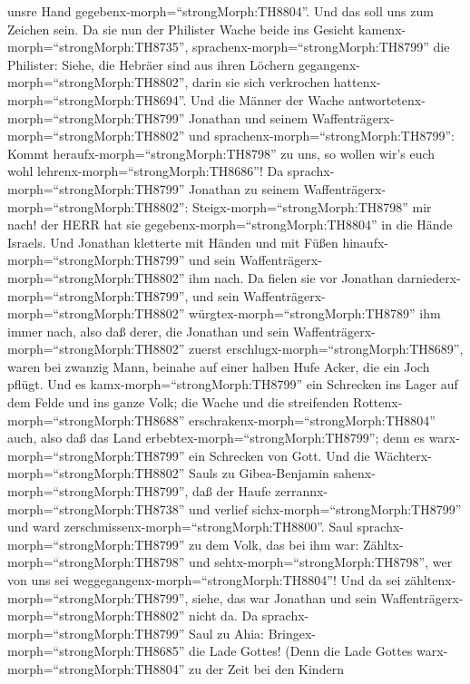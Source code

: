 unsre Hand gegebenx-morph=``strongMorph:TH8804''. Und das soll uns zum
Zeichen sein.  Da sie nun der Philister Wache beide ins
Gesicht kamenx-morph=``strongMorph:TH8735'',
sprachenx-morph=``strongMorph:TH8799'' die Philister: Siehe, die Hebräer
sind aus ihren Löchern gegangenx-morph=``strongMorph:TH8802'', darin sie
sich verkrochen hattenx-morph=``strongMorph:TH8694''.  Und
die Männer der Wache antwortetenx-morph=``strongMorph:TH8799'' Jonathan
und seinem Waffenträgerx-morph=``strongMorph:TH8802'' und
sprachenx-morph=``strongMorph:TH8799'': Kommt
heraufx-morph=``strongMorph:TH8798'' zu uns, so wollen wir's euch wohl
lehrenx-morph=``strongMorph:TH8686''! Da
sprachx-morph=``strongMorph:TH8799'' Jonathan zu seinem
Waffenträgerx-morph=``strongMorph:TH8802'':
Steigx-morph=``strongMorph:TH8798'' mir nach! der HERR hat sie
gegebenx-morph=``strongMorph:TH8804'' in die Hände Israels.
 Und Jonathan kletterte mit Händen und mit Füßen
hinaufx-morph=``strongMorph:TH8799'' und sein
Waffenträgerx-morph=``strongMorph:TH8802'' ihm nach. Da fielen sie vor
Jonathan darniederx-morph=``strongMorph:TH8799'', und sein
Waffenträgerx-morph=``strongMorph:TH8802''
würgtex-morph=``strongMorph:TH8789'' ihm immer nach,  also
daß derer, die Jonathan und sein
Waffenträgerx-morph=``strongMorph:TH8802'' zuerst
erschlugx-morph=``strongMorph:TH8689'', waren bei zwanzig Mann, beinahe
auf einer halben Hufe Acker, die ein Joch pflügt.  Und es
kamx-morph=``strongMorph:TH8799'' ein Schrecken ins Lager auf dem Felde
und ins ganze Volk; die Wache und die streifenden
Rottenx-morph=``strongMorph:TH8688''
erschrakenx-morph=``strongMorph:TH8804'' auch, also daß das Land
erbebtex-morph=``strongMorph:TH8799''; denn es
warx-morph=``strongMorph:TH8799'' ein Schrecken von Gott. 
Und die Wächterx-morph=``strongMorph:TH8802'' Sauls zu Gibea-Benjamin
sahenx-morph=``strongMorph:TH8799'', daß der Haufe
zerrannx-morph=``strongMorph:TH8738'' und verlief
sichx-morph=``strongMorph:TH8799'' und ward
zerschmissenx-morph=``strongMorph:TH8800''.  Saul
sprachx-morph=``strongMorph:TH8799'' zu dem Volk, das bei ihm war:
Zähltx-morph=``strongMorph:TH8798'' und
sehtx-morph=``strongMorph:TH8798'', wer von uns sei
weggegangenx-morph=``strongMorph:TH8804''! Und da sei
zähltenx-morph=``strongMorph:TH8799'', siehe, das war Jonathan und sein
Waffenträgerx-morph=``strongMorph:TH8802'' nicht da.  Da
sprachx-morph=``strongMorph:TH8799'' Saul zu Ahia:
Bringex-morph=``strongMorph:TH8685'' die Lade Gottes! (Denn die Lade
Gottes warx-morph=``strongMorph:TH8804'' zu der Zeit bei den Kindern
